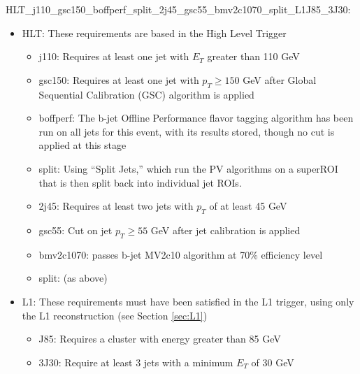         HLT\_j110\_gsc150\_boffperf\_split\_2j45\_gsc55\_bmv2c1070\_split\_L1J85\_3J30:
        \begin{itemize}
            \item HLT: These requirements are based in the High Level Trigger
                \begin{itemize}
                \item j110: Requires at least one jet with $E_T$ greater than 110 GeV
                \item gsc150: Requires at least one jet with $p_T \geq 150$ GeV after Global Sequential Calibration (GSC) algorithm is applied
                \item boffperf: The b-jet Offline Performance flavor tagging algorithm has been run on all jets for this event,
                    with its results stored, though no cut is applied at this stage
                \item split: Using ``Split Jets,'' which run the PV algorithms on a superROI
                    that is then split back into individual jet ROIs.
                \item 2j45: Requires at least two jets with $p_T$ of at least 45 GeV
                \item gsc55: Cut on jet $p_T \geq 55$ GeV after jet calibration is applied
                \item bmv2c1070: passes b-jet MV2c10 algorithm at 70\% efficiency level
                \item split: (as above)
            \end{itemize}
            \item L1: These requirements must have been satisfied in the L1 trigger,
                using only the L1 reconstruction (see Section \ref{sec:L1})
                \begin{itemize}
                \item J85: Requires a cluster with energy greater than 85 GeV
                \item 3J30: Require at least 3 jets with a minimum $E_T$ of 30 GeV
            \end{itemize}
        \end{itemize}


        

